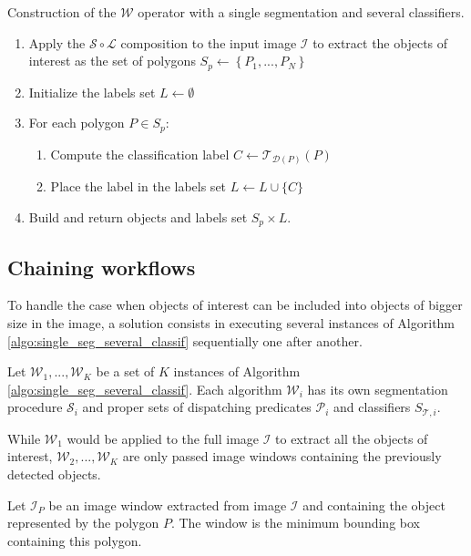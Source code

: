 \begin{algorithm}\label{algo:single_seg_several_classif}
Construction of the $\mathcal{W}$ operator with a single segmentation and several classifiers. 
\begin{enumerate}
	\item Apply the $\mathcal{S} \circ \mathcal{L}$ composition to the input image $\mathcal{I}$ to extract the objects of interest as the set of polygons $S_p \leftarrow \left\{P_1, ..., P_N \right\}$
	\item Initialize the labels set $L \leftarrow \emptyset$
	\item For each polygon $P \in S_p$:
	\begin{enumerate}
		\item Compute the classification label $C \leftarrow \mathcal{T}_{\mathcal{D}(P)}(P)$
		\item Place the label in the labels set $L \leftarrow L \cup \{C\}$
	\end{enumerate}
	\item Build and return objects and labels set $S_p \times L$.
\end{enumerate}
\end{algorithm}

\subsection{Chaining workflows}

To handle the case when objects of interest can be included into objects of bigger size in the image, a solution consists in executing several instances of Algorithm \ref{algo:single_seg_several_classif} sequentially one after another. 

\begin{definition}\label{def:several_w_op}
	Let $\mathcal{W}_1, ..., \mathcal{W}_K$ be a set of $K$ instances of Algorithm \ref{algo:single_seg_several_classif}. Each algorithm $\mathcal{W}_i$ has its own segmentation procedure $\mathcal{S}_i$ and proper sets of dispatching predicates $\mathcal{P}_i$ and classifiers $S_{\mathcal{T},i}$.
\end{definition}

While $\mathcal{W}_1$ would be applied to the full image $\mathcal{I}$ to extract all the objects of interest, $\mathcal{W}_2, ..., \mathcal{W}_K$ are only passed image windows containing the previously detected objects.

\begin{definition}\label{def:image_window}
	Let $\mathcal{I}_P$ be an image window extracted from image $\mathcal{I}$ and containing the object represented by the polygon $P$. The window is the minimum bounding box containing this polygon.
\end{definition}

